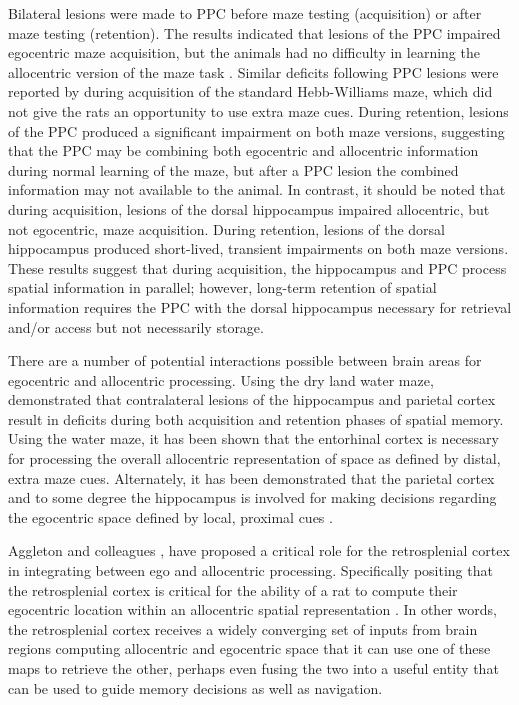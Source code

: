 \documentclass[doc, longtable]{apa6}
\begin{document}
Bilateral lesions were made to PPC before maze testing (acquisition) or after maze testing (retention). The results indicated that lesions of the PPC impaired egocentric maze acquisition, but the animals had no difficulty in learning the allocentric version of the maze task \parencite{Rogers2007a}. Similar deficits following PPC lesions were reported by \textcite{Boyd1977b} during acquisition of the standard Hebb-Williams maze, which did not give the rats an opportunity to use extra maze cues. During retention, lesions of the PPC produced a significant impairment on both maze versions, suggesting that the PPC may be combining both egocentric and allocentric information during normal learning of the maze, but after a PPC lesion the combined information may not available to the animal. In contrast, it should be noted that during acquisition, lesions of the dorsal hippocampus impaired allocentric, but not egocentric, maze acquisition. During retention, lesions of the dorsal hippocampus produced short-lived, transient impairments on both maze versions. These results suggest that during acquisition, the hippocampus and PPC process spatial information in parallel; however, long-term retention of spatial information requires the PPC with the dorsal hippocampus necessary for retrieval and/or access but not necessarily storage.
	
There are a number of potential interactions possible between brain areas for egocentric and allocentric processing. Using the dry land water maze, \textcite{Rogers2007a} demonstrated that contralateral lesions of the hippocampus and parietal cortex result in deficits during both acquisition and retention phases of spatial memory. Using the water maze, it has been shown that the entorhinal cortex is necessary for processing the overall allocentric representation of space as defined by distal, extra maze cues. Alternately, it has been demonstrated that the parietal cortex and to some degree the hippocampus is involved for making decisions regarding the egocentric space defined by local, proximal cues \parencite{Compton1997a, Save2005a, Save2000c}. 
	
Aggleton and colleagues \parencite{Aggleton2010, Aggleton2010b, Vann2009a}, have proposed a critical role for the retrosplenial cortex in integrating between ego and allocentric processing. Specifically positing that the retrosplenial cortex is critical for the ability of a rat to compute their egocentric location within an allocentric spatial representation \parencite{Hindley2014b, Hindley2014}. In other words, the retrosplenial cortex receives a widely converging set of inputs from brain regions computing allocentric and egocentric space that it can use one of these maps to retrieve the other, perhaps even fusing the two into a useful entity that can be used to guide memory decisions as well as navigation.
\end{document}
